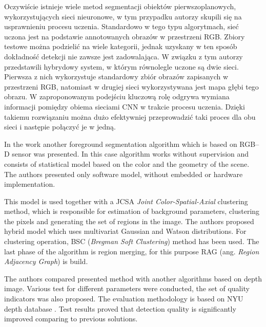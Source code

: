 \documentclass[b5paper,10pt,twoside]{article}
\begin{document}
{Oczywiście istnieje wiele metod segmentacji obiektów pierwszoplanowych, wykorzystujących sieci nieuronowe, w tym przypadku autorzy skupili się na usprawnieniu procesu uczenia. 
Standardowo w tego typu algorytmach, sieć uczona jest na podstawie annotowanych obrazów w przestrzeni RGB. 
Zbiory testowe można podzielić na wiele kategorii, jednak uzyskany w ten sposób dokładność detekcji nie zawsze jest zadowalająca. 
W związku z tym autorzy przedstawili hybrydowy system, w którym równolegle uczone są dwie sieci. 
Pierwsza z nich wykorzystuje standardowy zbiór obrazów zapisanych w przestrzeni RGB, natomiast w drugiej sieci wykorzystywana jest mapa głębi tego obrazu. W zaproponowanym podejściu kluczową rolę odgrywa wymiana informacji pomiędzy obiema sieciami CNN w trakcie procesu uczenia. 
Dzięki takiemu rozwiązaniu można dużo efektywniej przeprowadzić taki proces dla obu sieci i następie połączyć je w jedną. 

In the work \cite{Hasnat_2014} another foreground segmentation algorithm which is based on RGB--D sensor was presented. In this case algorithm works without supervision and consists of statistical model based on the color and the geometry of the scene. The authors presented only software model, without embedded or hardware implementation.

This model is used together with a JCSA \textit{Joint Color-Spatial-Axial} clustering method, which is responsible for estimation of background parameters, clustering the pixels and generating the set of regions in the image. The authors proposed hybrid model which uses multivariat Gaussian and Watson distributions. For clustering operation,   
BSC (\textit{Bregman Soft Clustering}) method has been used. The last phase of the algorithm is region merging, for this purpose RAG (ang. \textit{Region Adjacency Graph}) is build. 

The authors compared presented method with another algorithms based on depth image.  Various test for different parameters were conducted, the set of quality indicators was also proposed. The evaluation methodology is based on NYU depth database \cite{}. Test results proved that detection quality is significantly improved comparing to previous solutions.


}
\end{document}
